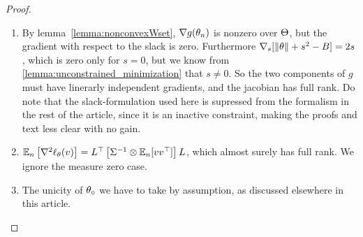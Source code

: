 \begin{proof}
\begin{enumerate}
    \item By lemma~\ref{lemma:nonconvexWset}, $\nabla g( \theta_n)$ is nonzero over $\Theta$, but the gradient with respect to the slack is zero. Furthermore $\nabla_s[\lVert\theta\rVert+s^2-B]=2s$, which is zero only for $s=0$, but we know from \ref{lemma:unconstrained_minimization} that $s\neq 0$. So the two components of $g$ must have linerarly independent gradients, and the jacobian has full rank. Do note that the slack-formulation used here is supressed from the formalism in the rest of the article, since it is an inactive constraint, making the proofs and text less clear with no gain.
    \item  $\mathbb{E}_n \left[ \nabla^2 \ell_{\theta}(v)\right] = L^\top \left[\Sigma^{-1} \otimes \mathbb{E}_n[vv^\top]\right]  L $, which almost surely has full rank. We ignore the measure zero case.
    \item The unicity of $\theta_\circ$ we have to take by assumption, as discussed elsewhere in this article.
\end{enumerate}
\end{proof}












